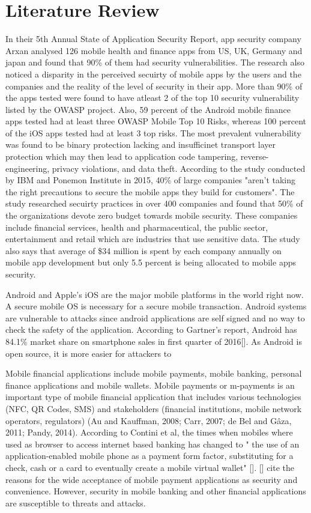 \documentclass{mproj}
\begin{document}
\chapter{Literature Review}\label{survey}
\nocite{*}
In their 5th Annual State of Application Security Report, app security company Arxan analysed 126 mobile health and finance apps from US, UK, Germany and japan and found that 90\% of them had security vulnerabilities. The research also noticed a disparity in the perceived secuirty of mobile apps by the users and the companies and the reality of the level of security in their app. More than 90\% of the apps tested were found to have atleast 2 of the top 10 security vulnerability listed by the OWASP project. Also,  59 percent of the Android mobile finance apps tested had at least three OWASP Mobile Top 10 Risks, whereas 100 percent of the iOS apps tested had at least 3 top risks. The most prevalent vulnerability was found to be binary protection lacking and insufficinet transport layer protection which may then lead to application code tampering, reverse-engineering, privacy violations, and data theft. According to the study conducted by IBM and Ponemon Institute in 2015, 40\% of large companies "aren’t taking the right precautions to secure the mobile apps they build for customers". The study researched secuirty practices in over 400 companies and found that 50\% of the organizations devote zero budget towards mobile security. These companies include financial services, health and pharmaceutical, the public sector, entertainment and retail which are industries that use sensitive data. The study also says that average of \$34 million is spent by each company annually on mobile app development but only 5.5 percent is being allocated to mobile apps  security.  

Android and Apple's iOS are the major mobile platforms in the world right now. A secure mobile OS is necessary for a secure mobile transaction. Android systems are vulnerable to attacks since android applications are self signed and no way to check the safety of the application. 
According to Gartner's report, Android has 84.1\% market share on smartphone sales in first quarter of 2016[]. As Android is open source, it is more easier for attackers to 

Mobile financial applications include mobile payments, mobile banking, personal finance applications and mobile wallets. Mobile payments or m-payments is an important type of mobile financial application that includes various technologies (NFC, QR Codes, SMS) and stakeholders (financial institutions, mobile network operators, regulators) (Au and Kauffman, 2008; Carr, 2007; de Bel and Gâza, 2011; Pandy, 2014). According to Contini et al, the times when mobiles where used as browser to access internet based banking has changed to " the use of an application-enabled mobile phone as a payment form factor, substituting for a check, cash or a card to eventually create a mobile virtual wallet" []. [] cite the reasons for the wide acceptance of mobile payment applications as security and convenience. However, security in mobile banking and other financial applications are susceptible to threats and attacks.
\end{document}
